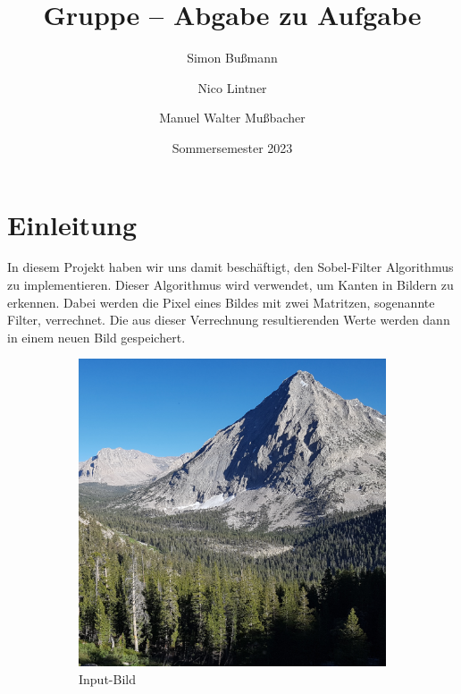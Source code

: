 \documentclass[course=erap]{aspdoc}
\author{Simon Bußmann \and Nico Lintner \and Manuel Walter Mußbacher}
\date{Sommersemester 2023}
\title{Gruppe \theGroup{} -- Abgabe zu Aufgabe \theNumber}
\begin{document}
\maketitle

\section{Einleitung}

In diesem Projekt haben wir uns damit beschäftigt, den Sobel-Filter Algorithmus zu implementieren.
Dieser Algorithmus wird verwendet, um Kanten in Bildern zu erkennen.
Dabei werden die Pixel eines Bildes mit zwei Matritzen, sogenannte Filter, verrechnet.
Die aus dieser Verrechnung resultierenden Werte werden dann in einem neuen Bild gespeichert.
\begin{figure}[H]
    \begin{subfigure}{.5\columnwidth}
        \centering
        \includegraphics[width=\columnwidth]{graphics/johnmuirtrail.png}
        \caption{Input-Bild}
        \label{fig:input-bild}
    \end{subfigure}
    \begin{subfigure}{.5\columnwidth}
        \centering

\end{subfigure}
\end{figure}
\end{document}
